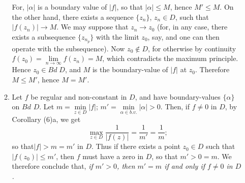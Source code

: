 \begin{corollaries*}
\begin{enumerate}
\begin{enumerate}
For, $|\alpha|$ is a boundary value of $|f|$, so that $|\alpha| \leq
M$, hence $M' \leq M$. On the other hand, there exists a sequence
$\{z_n\}$, $z_n \in D$, such that $|f(z_n)| \to M$. We may suppose
that $z_n \to z_0$ (for, in any case, there exists a subsequence
$\{z_{n_p}\}$ with the limit $z_0$, say, and one can then operate with
the subsequence). Now $z_0 \notin D$, for otherwise by continuity
$f(z_0) = \lim\limits_{n \to \infty} f(z_n) = M$, which contradicts
the maximum principle. Hence $z_0 \in Bd \; D$, and $M$ is the
boundary-value of $|f|$ at $z_0$. Therefore $M \leq M'$, hence $M =
M'$.

\item Let $f$ be regular and non-constant in $D$, and have
  boundary-values $\{\alpha\}$ on $Bd$ $D$. Let $m = \min\limits_{z
    \in D} |f|$; $m'= \min\limits_{\alpha \in b.v.} |\alpha|
  >0$. Then, if $f \neq 0$ in $D$, by Corollary (6)a, we get 
$$
\max\limits_{z \in D} \frac{1}{|f(z)|} = \frac{1}{m'} = \frac{1}{m};
$$
so that\pageoriginale $|f|>m = m'$ in $D$. Thus if there exists a
point $z_0 \in D$ such that $|f(z_0)| \leq m'$, then $f$ must have a
zero in $D$, so that $m' > 0 = m$. We therefore conclude that, {\em if $m'
>0$, then $m'=m$ if and only if $f \neq 0$ in $D$ \cite[Bd. I, p.135]{key6}.}
\end{enumerate}
\end{enumerate}
\end{corollaries*}
